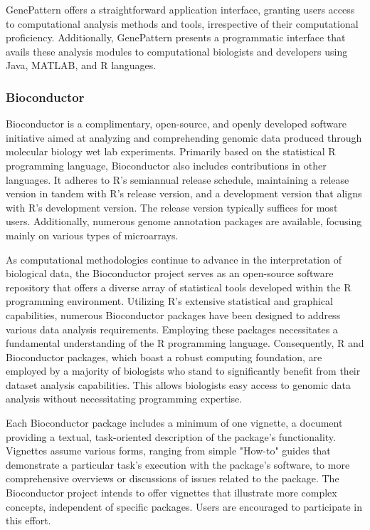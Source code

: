             GenePattern offers a straightforward application interface, granting users access to computational analysis methods and tools, irrespective of their computational proficiency. Additionally, GenePattern presents a programmatic interface that avails these analysis modules to computational biologists and developers using Java, MATLAB, and R languages.

        \subsubsection{Bioconductor}
            Bioconductor is a complimentary, open-source, and openly developed software initiative aimed at analyzing and comprehending genomic data produced through molecular biology wet lab experiments\cite{gentleman2004bioconductor}. Primarily based on the statistical R programming language, Bioconductor also includes contributions in other languages. It adheres to R's semiannual release schedule, maintaining a release version in tandem with R's release version, and a development version that aligns with R's development version. The release version typically suffices for most users. Additionally, numerous genome annotation packages are available, focusing mainly on various types of microarrays.

            As computational methodologies continue to advance in the interpretation of biological data, the Bioconductor project serves as an open-source software repository that offers a diverse array of statistical tools developed within the R programming environment. Utilizing R's extensive statistical and graphical capabilities, numerous Bioconductor packages have been designed to address various data analysis requirements. Employing these packages necessitates a fundamental understanding of the R programming language. Consequently, R and Bioconductor packages, which boast a robust computing foundation, are employed by a majority of biologists who stand to significantly benefit from their dataset analysis capabilities. This allows biologists easy access to genomic data analysis without necessitating programming expertise.
            
            Each Bioconductor package includes a minimum of one vignette, a document providing a textual, task-oriented description of the package's functionality. Vignettes assume various forms, ranging from simple "How-to" guides that demonstrate a particular task's execution with the package's software, to more comprehensive overviews or discussions of issues related to the package. The Bioconductor project intends to offer vignettes that illustrate more complex concepts, independent of specific packages. Users are encouraged to participate in this effort.
            
